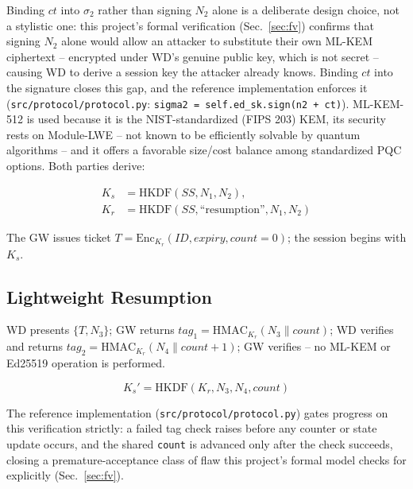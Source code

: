 \documentclass[conference]{IEEEtran}
\begin{document}
Binding $ct$ into $\sigma_2$ rather than signing $N_2$ alone is a
deliberate design choice, not a stylistic one: this project's formal
verification (Sec.~\ref{sec:fv}) confirms that signing $N_2$ alone would
allow an attacker to substitute their own ML-KEM ciphertext -- encrypted
under WD's genuine public key, which is not secret -- causing WD to derive
a session key the attacker already knows. Binding $ct$ into the signature
closes this gap, and the reference implementation enforces it
(\texttt{src/protocol/protocol.py}: \texttt{sigma2 = self.ed\_sk.sign(n2 + ct)}).
ML-KEM-512 is used because it is the NIST-standardized (FIPS 203) KEM, its
security rests on Module-LWE -- not known to be efficiently solvable by
quantum algorithms -- and it offers a favorable size/cost balance among
standardized PQC options. Both parties derive:

\begin{equation}
\begin{aligned}
K_s &= \mathrm{HKDF}(SS, N_1, N_2), \\
K_r &= \mathrm{HKDF}(SS, \text{``resumption''}, N_1, N_2)
\end{aligned}
\label{eq:kdf-full}
\end{equation}

The GW issues ticket $T = \mathrm{Enc}_{K_r}(ID, \mathit{expiry}, \mathit{count}{=}0)$;
the session begins with $K_s$.

\subsection{Lightweight Resumption}

WD presents $\{T, N_3\}$; GW returns $\mathit{tag}_1 = \mathrm{HMAC}_{K_r}(N_3 \| \mathit{count})$;
WD verifies and returns $\mathit{tag}_2 = \mathrm{HMAC}_{K_r}(N_4 \| \mathit{count}{+}1)$;
GW verifies -- no ML-KEM or Ed25519 operation is performed.

\begin{equation}
K_s' = \mathrm{HKDF}(K_r, N_3, N_4, \mathit{count})
\label{eq:kdf-resume}
\end{equation}

The reference implementation (\texttt{src/protocol/protocol.py}) gates
progress on this verification strictly: a failed tag check raises before
any counter or state update occurs, and the shared \texttt{count} is
advanced only after the check succeeds, closing a premature-acceptance
class of flaw this project's formal model checks for explicitly
(Sec.~\ref{sec:fv}).
\end{document}
